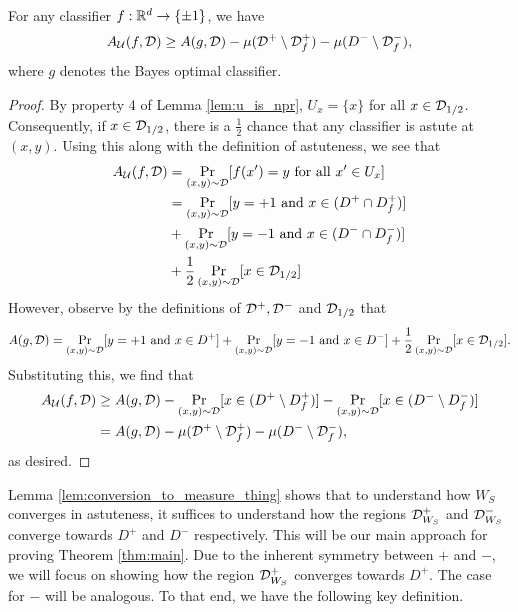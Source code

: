 \begin{lem}\label{lem:conversion_to_measure_thing}
For any classifier $f: \mathbb R^d \to \{\pm 1\}$, we have $$A_{\mathcal U}(f, {\mathcal D}) \geq A(g, {\mathcal D}) - \mu({\mathcal D}^+ \setminus {\mathcal D}_f^+) - \mu(D^- \setminus {\mathcal D}_f^-),$$ where $g$ denotes the Bayes optimal classifier.
\end{lem}

\begin{proof}
By property 4 of Lemma \ref{lem:u_is_npr}, $U_x = \{x\}$ for all $x \in {\mathcal D}_{1/2}$. Consequently, if $x \in {\mathcal D}_{1/2}$, there is a $\frac{1}{2}$ chance that any classifier is astute at $(x,y)$. Using this along with the definition of astuteness, we see that 
\begin{equation*}
\begin{split}
A_{\mathcal U}(f, {\mathcal D}) &= \Pr_{(x,y) \sim {\mathcal D}} [f(x') = y\text{ for all }x' \in U_x] \\
&= \Pr_{(x,y) \sim {\mathcal D}}[y = +1\text{ and }x \in (D^+ \cap D_f^+)]\\ &+ \Pr_{(x,y) \sim {\mathcal D}}[y = -1\text{ and }x \in (D^- \cap D_f^-)] \\ &+ \frac{1}{2}\Pr_{(x,y) \sim {\mathcal D}}[x \in {\mathcal D}_{1/2}]
\end{split}
\end{equation*}
However, observe by the definitions of ${\mathcal D}^+, {\mathcal D}^-$ and ${\mathcal D}_{1/2}$ that $$A(g, {\mathcal D}) = \Pr_{(x,y) \sim {\mathcal D}}[y = +1\text{ and }x \in D^+] + \Pr_{(x,y) \sim {\mathcal D}}[y = -1\text{ and }x \in D^-] + \frac{1}{2}\Pr_{(x,y) \sim {\mathcal D}}[x \in {\mathcal D}_{1/2}].$$ Substituting this, we find that 
\begin{equation*}
\begin{split}
A_{\mathcal U}(f, {\mathcal D}) &\geq A(g, {\mathcal D}) - \Pr_{(x,y) \sim {\mathcal D}}[x \in (D^+ \setminus D_f^+)] - \Pr_{(x,y) \sim {\mathcal D}}[x \in (D^- \setminus D_f^-)] \\
&= A(g, {\mathcal D}) - \mu({\mathcal D}^+ \setminus {\mathcal D}_f^+) - \mu(D^- \setminus {\mathcal D}_f^-),
\end{split}
\end{equation*}
as desired. 
\end{proof}

Lemma \ref{lem:conversion_to_measure_thing} shows that to understand how $W_S$ converges in astuteness, it suffices to understand how the regions ${\mathcal D}_{W_S}^+$ and ${\mathcal D}_{W_S}^-$ converge towards $D^+$ and $D^-$ respectively. This will be our main approach for proving Theorem \ref{thm:main}. Due to the inherent symmetry between $+$ and $-$, we will focus on showing how the region ${\mathcal D}_{W_S}^+$ converges towards $D^+$. The case for $-$ will be analogous. To that end, we have the following key definition. 

